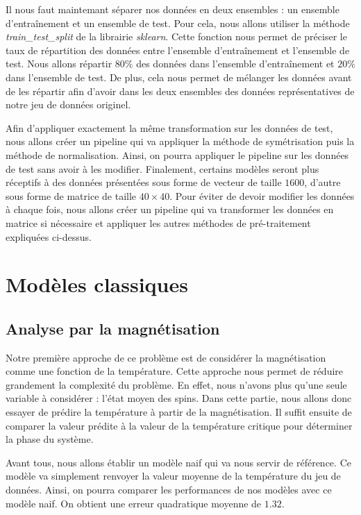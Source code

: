 \documentclass[11pt, parskip=half]{scrartcl} %
\begin{document}
Il nous faut maintemant séparer nos données en deux ensembles : un ensemble d'entraînement et un ensemble de test. Pour cela, nous allons utiliser la méthode \textit{train\_test\_split} de la librairie \textit{sklearn}. Cette fonction nous permet de préciser le taux de répartition des données entre l'ensemble d'entraînement et l'ensemble de test. Nous allons répartir $80\%$ des données dans l'ensemble d'entraînement et $20\%$ dans l'ensemble de test. De plus, cela nous permet de mélanger les données avant de les répartir afin d'avoir dans les deux ensembles des données représentatives de notre jeu de données originel.

Afin d'appliquer exactement la même transformation sur les données de test, nous allons créer un pipeline qui va appliquer la méthode de symétrisation puis la méthode de normalisation. Ainsi, on pourra appliquer le pipeline sur les données de test sans avoir à les modifier.
Finalement, certains modèles seront plus réceptifs à des données présentées sous forme de vecteur de taille $1600$, d'autre sous forme de matrice de taille $40 \times 40$. Pour éviter de devoir modifier les données à chaque fois, nous allons créer un pipeline qui va transformer les données en matrice si nécessaire et appliquer les autres méthodes de pré-traitement expliquées ci-dessus.

\section{Modèles classiques}

\subsection{Analyse par la magnétisation}
Notre première approche de ce problème est de considérer la magnétisation comme une fonction de la température. Cette approche nous permet de réduire grandement la complexité du problème. En effet, nous n'avons plus qu'une seule variable à considérer : l'état moyen des spins. Dans cette partie, nous allons donc essayer de prédire la température à partir de la magnétisation. Il suffit ensuite de comparer la valeur prédite à la valeur de la température critique pour déterminer la phase du système.

Avant tous, nous allons établir un modèle naif qui va nous servir de référence. Ce modèle va simplement renvoyer la valeur moyenne de la température du jeu de données. Ainsi, on pourra comparer les performances de nos modèles avec ce modèle naif. On obtient une erreur quadratique moyenne de $1.32$.
\end{document}
